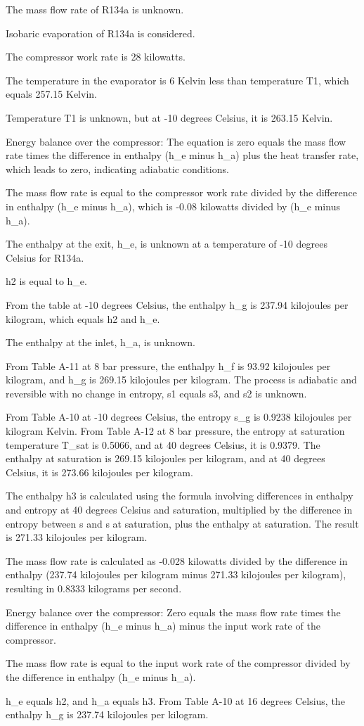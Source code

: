 The mass flow rate of R134a is unknown.

Isobaric evaporation of R134a is considered.

The compressor work rate is 28 kilowatts.

The temperature in the evaporator is 6 Kelvin less than temperature T1, which equals 257.15 Kelvin.

Temperature T1 is unknown, but at -10 degrees Celsius, it is 263.15 Kelvin.

Energy balance over the compressor:
The equation is zero equals the mass flow rate times the difference in enthalpy (h_e minus h_a) plus the heat transfer rate, which leads to zero, indicating adiabatic conditions.

The mass flow rate is equal to the compressor work rate divided by the difference in enthalpy (h_e minus h_a), which is -0.08 kilowatts divided by (h_e minus h_a).

The enthalpy at the exit, h_e, is unknown at a temperature of -10 degrees Celsius for R134a.

h2 is equal to h_e.

From the table at -10 degrees Celsius, the enthalpy h_g is 237.94 kilojoules per kilogram, which equals h2 and h_e.

The enthalpy at the inlet, h_a, is unknown.

From Table A-11 at 8 bar pressure, the enthalpy h_f is 93.92 kilojoules per kilogram, and h_g is 269.15 kilojoules per kilogram. The process is adiabatic and reversible with no change in entropy, s1 equals s3, and s2 is unknown.

From Table A-10 at -10 degrees Celsius, the entropy s_g is 0.9238 kilojoules per kilogram Kelvin. From Table A-12 at 8 bar pressure, the entropy at saturation temperature T_sat is 0.5066, and at 40 degrees Celsius, it is 0.9379. The enthalpy at saturation is 269.15 kilojoules per kilogram, and at 40 degrees Celsius, it is 273.66 kilojoules per kilogram.

The enthalpy h3 is calculated using the formula involving differences in enthalpy and entropy at 40 degrees Celsius and saturation, multiplied by the difference in entropy between s and s at saturation, plus the enthalpy at saturation. The result is 271.33 kilojoules per kilogram.

The mass flow rate is calculated as -0.028 kilowatts divided by the difference in enthalpy (237.74 kilojoules per kilogram minus 271.33 kilojoules per kilogram), resulting in 0.8333 kilograms per second.

Energy balance over the compressor:
Zero equals the mass flow rate times the difference in enthalpy (h_e minus h_a) minus the input work rate of the compressor.

The mass flow rate is equal to the input work rate of the compressor divided by the difference in enthalpy (h_e minus h_a).

h_e equals h2, and h_a equals h3. From Table A-10 at 16 degrees Celsius, the enthalpy h_g is 237.74 kilojoules per kilogram.